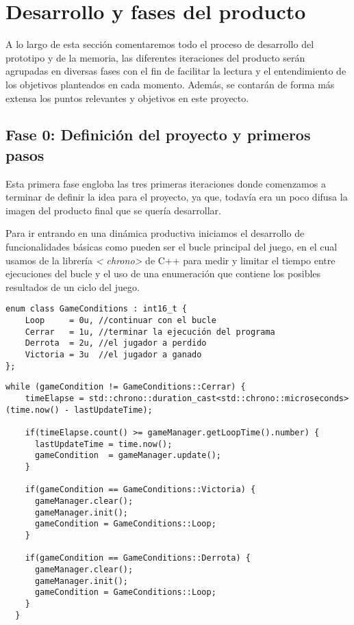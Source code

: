 \chapter{Desarrollo y fases del producto}
A lo largo de esta sección comentaremos todo el proceso de desarrollo del prototipo y de la 
memoria, las diferentes iteraciones del producto serán agrupadas en diversas fases con el fin
de facilitar la lectura y el entendimiento de los objetivos planteados en cada momento. Además,
se contarán de forma más extensa los puntos relevantes y objetivos en este proyecto.

\section{Fase 0: Definición del proyecto y primeros pasos}
Esta primera fase engloba las tres primeras iteraciones donde comenzamos a terminar de definir 
la idea para el proyecto, ya que, todavía era un poco difusa la imagen del producto final que se
quería desarrollar.

Para ir entrando en una dinámica productiva iniciamos el desarrollo de funcionalidades básicas 
como pueden ser el bucle principal del juego, en el cual usamos de la librería \textit{\textless
chrono\textgreater} de C++ para medir y limitar el tiempo entre ejecuciones del bucle y el uso 
de una enumeración que contiene los posibles resultados de un ciclo del juego.

\begin{lstlisting}[style=CodigoC++, caption={Resultados iteración bucle},label=game_conditions]
enum class GameConditions : int16_t {
    Loop     = 0u, //continuar con el bucle
    Cerrar   = 1u, //terminar la ejecución del programa
    Derrota  = 2u, //el jugador a perdido
    Victoria = 3u  //el jugador a ganado
};
\end{lstlisting}

\begin{lstlisting}[style=CodigoC++, caption={Bucle del juego},label=loop]
while (gameCondition != GameConditions::Cerrar) {
    timeElapse = std::chrono::duration_cast<std::chrono::microseconds>(time.now() - lastUpdateTime);

    if(timeElapse.count() >= gameManager.getLoopTime().number) {
      lastUpdateTime = time.now();
      gameCondition  = gameManager.update();
    }

    if(gameCondition == GameConditions::Victoria) {
      gameManager.clear();
      gameManager.init();
      gameCondition = GameConditions::Loop;
    }

    if(gameCondition == GameConditions::Derrota) {
      gameManager.clear();
      gameManager.init();
      gameCondition = GameConditions::Loop;
    }
  }
\end{lstlisting}

